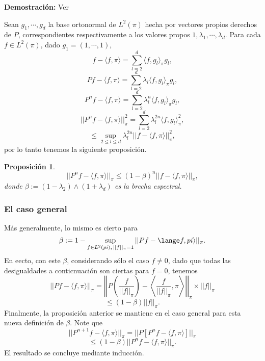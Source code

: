 \documentclass[a4paper]{article}
\newtheorem{prop}{Proposici\'on}
\numberwithin{equation}{subsection}
\begin{document}
\textbf{Demostración: }Ver \cite[Pag. 41]{Pard}\\ \newline

Sean $g_1, \cdots, g_d$ la base ortonormal de $L^2(\pi)$ hecha por vectores propios derechos de $P$, correspondientes respectivamente a los valores propos $1,\lambda_1,\cdots, \lambda_d$. Para cada $f\in L^2(\pi)$, dado $g_1 = (1,\cdots,1)$,
\[f-\langle f,\pi \rangle = \sum_{l=2}^d \langle f,g_l \rangle_{\pi}g_l,\]
\[Pf - \langle f,\pi \rangle = \sum_{l=2}^d \lambda_l \langle f,g_l \rangle_{\pi}g_l,\]
\[P^nf - \langle f,\pi \rangle = \sum_{l=2}^d \lambda_l^n \langle f,g_l \rangle_{\pi}g_l,\]
\[|| P^nf -\langle f,\pi \rangle||_{\pi}^2 = \sum_{l=2}^d \lambda_l^{2n}\langle f,g_l\rangle_{\pi}^2,\]
\[\leq \sup_{2\leq l\leq d}\lambda_{l}^{2n}||f-\langle f,\pi \rangle ||_{\pi}^2,\]
por lo tanto tenemos la siguiente proposición.
\begin{prop}
\[||P^nf - \langle f,\pi \rangle ||_{\pi} \leq (1-\beta)^n ||f-\langle f,\pi \rangle ||_{\pi},\]
donde $\beta := (1-\lambda_2)\wedge (1+\lambda_d)$ es la brecha espectral.
\end{prop}

\subsubsection{El caso general}
Más generalmente, lo mismo es cierto para
\[\beta := 1 - \sup_{f\in L^2(pi),\,||f||_{\pi} = 1} ||Pf - \lange f,pi \rangle||_{\pi}.\]
En eecto, con este $\beta$, considerando sólo el caso $f\neq 0$, dado que todas las desigualdades a conticnuación son ciertas para $f=0$, tenemos
\[||Pf -\langle f,\pi \rangle ||_{\pi} = \left|\left| P \left(\frac{f}{||f||_\pi}\right) - \left\langle \frac{f}{||f||_{\pi}},\pi\right\rangle \right|\right|_{\pi} \times ||f||_{\pi}\]
\[\leq (1-\beta)||f||_{\pi}.\]
Finalmente, la proposición anterior se mantiene en el caso general para esta nueva definición de $\beta$. Note que
\[||P^{n+1}f - \langle f,\pi \rangle||_{\pi} = ||P[P^nf - \langle f,\pi \rangle]||_{\pi}\]
\[\leq (1-\beta)||P^nf- \langle f,\pi \rangle||_{\pi}.\]
El resultado se concluye mediante inducción.
\end{document}
